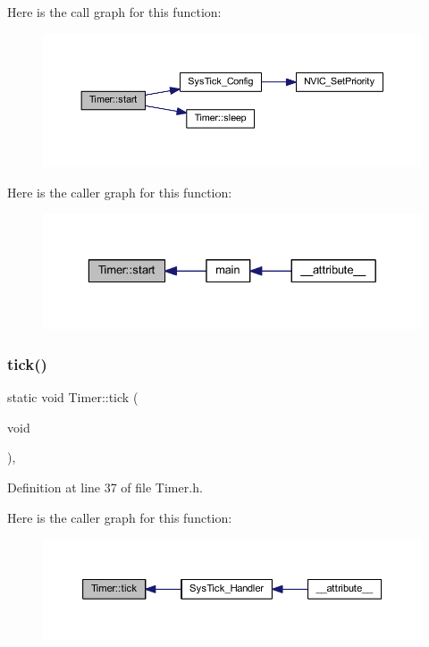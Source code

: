 Here is the call graph for this function\+:
\nopagebreak
\begin{figure}[H]
\begin{center}
\leavevmode
\includegraphics[width=350pt]{class_timer_abb13e798f6d89b09fdc9182d64c7558b_cgraph}
\end{center}
\end{figure}
Here is the caller graph for this function\+:
\nopagebreak
\begin{figure}[H]
\begin{center}
\leavevmode
\includegraphics[width=329pt]{class_timer_abb13e798f6d89b09fdc9182d64c7558b_icgraph}
\end{center}
\end{figure}
\mbox{\label{class_timer_afba5678215b6aa1983edf2c08241c99b}} 
\subsubsection{\texorpdfstring{tick()}{tick()}}
{\footnotesize\ttfamily static void Timer\+::tick (\begin{DoxyParamCaption}\item[{void}]{ }\end{DoxyParamCaption})\hspace{0.3cm}{\ttfamily [inline]}, {\ttfamily [static]}}



Definition at line 37 of file Timer.\+h.

Here is the caller graph for this function\+:
\nopagebreak
\begin{figure}[H]
\begin{center}
\leavevmode
\includegraphics[width=350pt]{class_timer_afba5678215b6aa1983edf2c08241c99b_icgraph}
\end{center}
\end{figure}


